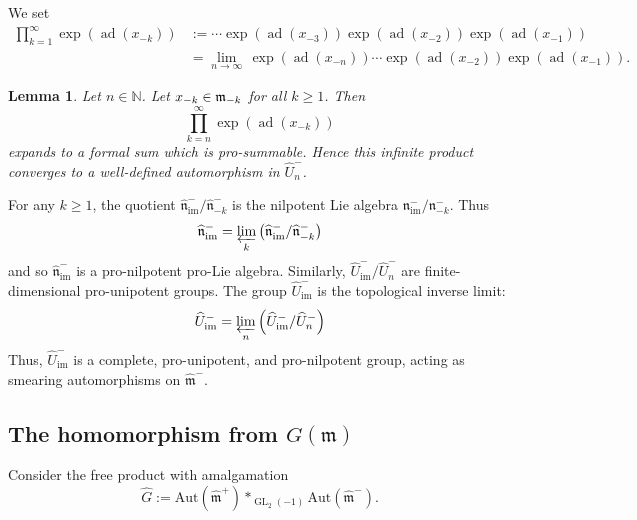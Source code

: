 \documentclass[11pt,letterpaper]{amsart}
\newcounter{thecounter}
\numberwithin{thecounter}{section}
\newtheorem{lemma}[thecounter]{Lemma}
\theoremstyle{definition}
\DeclareMathOperator{\GL}{GL}
\DeclareMathOperator{\ad}{ad}
\DeclareMathOperator{\im}{{im}}
\newcommand{\N}{{\mathbb N}}
\begin{document}
\begin{longver}
We set
\begin{align*}
\prod_{k=1}^\infty \exp\left(\ad\left(x_{-k} \right) \right)
&:= \cdots  \exp\left(\ad\left(x_{-3} \right) \right)  \exp\left(\ad\left(x_{-2} \right) \right) \exp\left(\ad\left(x_{-1} \right) \right)\\
&= \lim_{n\to\infty}\,  \exp\left(\ad\left(x_{-n} \right) \right) \cdots  \exp\left(\ad\left(x_{-2} \right) \right) \exp\left(\ad\left(x_{-1} \right) \right).
\end{align*}

\begin{lemma} Let $n\in\N$.
Let $x_{-k}\in \frak m_{-k}$  for all $k\geq1$. Then
$$\prod_{k=n}^\infty \exp\left(\ad\left(x_{-k} \right) \right)$$
expands to a formal sum which is pro-summable. Hence this infinite product converges to
 a well-defined automorphism in $\widehat{U}^-_{n}$.
\end{lemma}

For any $k \ge 1$, the quotient $\widehat{\mathfrak{n}}_{\im}^- / \widehat{\mathfrak{n}}_{-k}^-$ is  the nilpotent Lie algebra $\mathfrak{n}_{\im}^- / \mathfrak{n}_{-k}^-$. Thus
\[ 
\widehat{\mathfrak{n}}_{\im}^- = \varprojlim_{k} \left( \widehat{\mathfrak{n}}_{\im}^- / \widehat{\mathfrak{n}}_{-k}^- \right) 
\]
and so $\widehat{\mathfrak{n}}_{\im}^-$ is a {pro-nilpotent pro-Lie algebra}. Similarly,  $\widehat{U}_{\im}^- / \widehat{U}_{n}^-$ are finite-dimensional pro-unipotent groups. The group $\widehat{U}_{\im}^-$ is the topological inverse limit:
\[ 
\widehat{U}_{\im}^- = \varprojlim_{n} \left( \widehat{U}_{\im}^- / \widehat{U}_n^- \right) 
\]
Thus, $\widehat{U}_{\im}^-$ is  a {complete, pro-unipotent, and pro-nilpotent group}, acting  as smearing automorphisms on  $\widehat{\mathfrak{m}}^-$. 



\subsection{The homomorphism from $G(\mathfrak m)$}
\end{longver}

Consider the free product with amalgamation
$$\widehat{G} := \text{Aut}(\widehat{\mathfrak{m}}^+) *_{\GL_2(-1)} \text{Aut}(\widehat{\mathfrak{m}}^-).$$
\end{document}
